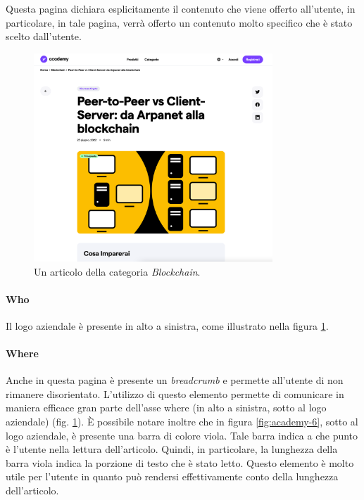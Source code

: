 Questa pagina dichiara esplicitamente il contenuto che viene offerto 
all'utente, in particolare, in tale pagina, verrà offerto un contenuto 
molto specifico che è stato scelto dall'utente. 

\begin{figure}[H]
  \centering
  \includegraphics[width=0.80\textwidth]{res/images/internal-pages/academy/academy-5.png}
  \caption{Un articolo della categoria \textit{Blockchain}.}
  \label{fig:academy-5}
\end{figure}

\paragraph{Who}

Il logo aziendale è presente in alto a sinistra, come illustrato 
nella figura \ref{fig:academy-5}.

\paragraph{Where}

Anche in questa pagina è presente un \textit{breadcrumb} e permette 
all'utente di non rimanere disorientato. L'utilizzo di questo elemento 
permette di comunicare in maniera efficace gran parte dell'asse where 
(in alto a sinistra, sotto al logo aziendale) (fig. \ref{fig:academy-5}). 
È possibile notare inoltre che in figura \ref{fig:academy-6}, sotto al 
logo aziendale, è presente una barra di colore viola. Tale barra indica 
a che punto è l'utente nella lettura dell'articolo. Quindi, in particolare, 
la lunghezza della barra viola indica la porzione di testo che è stato 
letto. Questo elemento è molto utile per l'utente in quanto può 
rendersi effettivamente conto della lunghezza dell'articolo.

